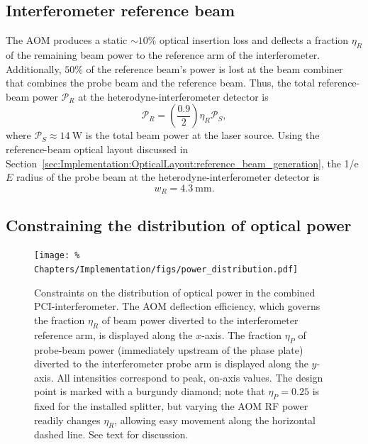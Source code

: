 \subsection{Interferometer reference beam}
\label{sec:Implementation:PowerDistribution:interferometer_reference_beam}
The AOM produces a static $\sim 10\%$ optical insertion loss and
deflects a fraction $\eta_R$ of the remaining beam power
to the reference arm of the interferometer.
Additionally, $50\%$ of the reference beam's power is lost
at the beam combiner that combines the probe beam and the reference beam.
Thus, the total reference-beam power $\mathcal{P}_R$
at the heterodyne-interferometer detector is
\begin{equation}
  \mathcal{P}_R
  =
  \left( \frac{0.9}{2} \right) \eta_R \mathcal{P}_S,
  \label{eq:Implementation:reference_beam_power_constraint}
\end{equation}
where $\mathcal{P}_S \approx \SI{14}{\watt}$
is the total beam power at the laser source.
Using the reference-beam optical layout discussed in
Section~\ref{sec:Implementation:OpticalLayout:reference_beam_generation},
the 1/e $E$ radius of the probe beam
at the heterodyne-interferometer detector is
\begin{equation}
  w_R = \SI{4.3}{\milli\meter}.
  \label{eq:Implementation:reference_beam_radius_at_detector}
\end{equation}


\subsection{Constraining the distribution of optical power}
\label{sec:Implementation:PowerDistribution:constraints}
\begin{figure}
  \centering
  \texttt{[image: \%
    Chapters/Implementation/figs/power\_distribution.pdf]}
  \caption[Constraints on the distribution of optical power]{%
    Constraints on the distribution of optical power
    in the combined PCI-interferometer.
    The AOM deflection efficiency,
    which governs the fraction $\eta_R$
    of beam power diverted to the interferometer reference arm,
    is displayed along the $x$-axis.
    The fraction $\eta_P$ of probe-beam power
    (immediately upstream of the phase plate)
    diverted to the interferometer probe arm
    is displayed along the $y$-axis.
    All intensities correspond to peak, on-axis values.
    The design point is marked with a burgundy diamond;
    note that $\eta_P = 0.25$ is fixed for the installed splitter, but
    varying the AOM RF power readily changes $\eta_R$,
    allowing easy movement along the horizontal dashed line.
    See text for discussion.
  }
\label{fig:Implementation:power_distribution}
\end{figure}

